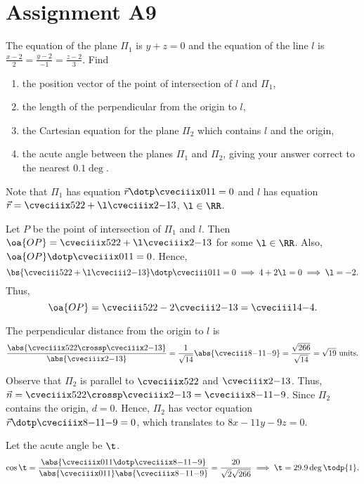 \clearpage
\section{Assignment A9}

\begin{problem}
    The equation of the plane $\Pi_1$ is $y + z = 0$ and the equation of the line $l$ is $\frac{x-2}2 = \frac{y-2}{-1} = \frac{z-2}3$. Find
    \begin{enumerate}
        \item the position vector of the point of intersection of $l$ and $\Pi_1$,
        \item the length of the perpendicular from the origin to $l$,
        \item the Cartesian equation for the plane $\Pi_2$ which contains $l$ and the origin,
        \item the acute angle between the planes $\Pi_1$ and $\Pi_2$, giving your answer correct to the nearest $0.1 \deg$.
    \end{enumerate}
\end{problem}
\begin{solution}
    Note that $\Pi_1$ has equation $\vec r \dotp \cveciiix011 = 0$ and $l$ has equation $\vec r = \cveciiix522 + \l \cveciiix2{-1}3$, $\l \in \RR$.

    \begin{ppart}
        Let $P$ be the point of intersection of $\Pi_1$ and $l$. Then $\oa{OP} = \cveciiix522 + \l \cveciiix2{-1}3$ for some $\l \in \RR$. Also, $\oa{OP} \dotp \cveciiix011 = 0$. Hence, \[\bs{\cveciii522 + \l \cveciii2{-1}3} \dotp \cveciii011 = 0 \implies 4 + 2\l = 0 \implies \l = -2.\] Thus, \[\oa{OP} = \cveciii522 - 2\cveciii2{-1}3 = \cveciii14{-4}.\]
    \end{ppart}
    \begin{ppart}
        The perpendicular distance from the origin to $l$ is \[\frac{\abs{\cveciiix522 \crossp \cveciiix2{-1}3}}{\abs{\cveciiix2{-1}3}} = \frac1{\sqrt{14}} \abs{\cveciii8{-11}{-9}} = \frac{\sqrt{266}}{\sqrt{14}} = \sqrt{19} \text{ units}.\]
    \end{ppart}
    \begin{ppart}
        Observe that $\Pi_2$ is parallel to $\cveciiix522$ and $\cveciiix2{-1}3$. Thus, $\vec n = \cveciiix522 \crossp \cveciiix2{-1}3 = \cveciiix8{-11}{-9}$. Since $\Pi_2$ contains the origin, $d = 0$. Hence, $\Pi_2$ has vector equation $\vec r \dotp \cveciiix8{-11}{-9} = 0$, which translates to $8x - 11y - 9z = 0$.
    \end{ppart}
    \begin{ppart}
        Let the acute angle be $\t$. \[\cos\t = \frac{\abs{\cveciiix011 \dotp \cveciiix8{-11}{-9}}}{\abs{\cveciiix011}\abs{\cveciiix8{-11}{-9}}} = \frac{20}{\sqrt{2}\sqrt{266}} \implies \t = 29.9\deg \todp{1}.\]
    \end{ppart}
\end{solution}


